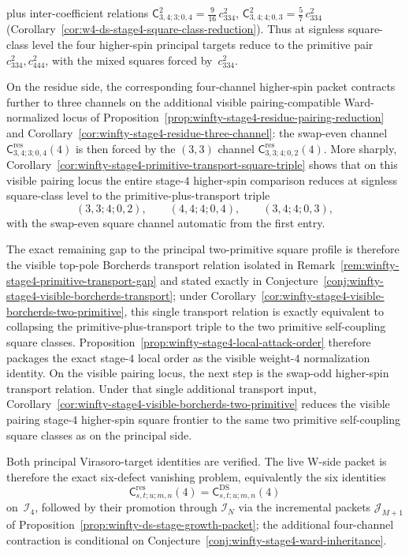 \begin{remark}
plus inter-coefficient relations
$\mathsf{C}_{3,4;3;0,4}^2 = \tfrac{9}{16}\,c_{334}^2$,
$\mathsf{C}_{3,4;4;0,3}^2 = \tfrac{5}{7}\,c_{334}^2$
\textup{(}Corollary~\ref{cor:w4-ds-stage4-square-class-reduction}\textup{)}.
Thus at signless square-class level the four higher-spin principal
targets reduce to the primitive pair
$c_{334}^2,c_{444}^2$, with the mixed squares forced by~$c_{334}^2$.

On the residue side, the corresponding four-channel higher-spin packet
contracts further to three channels on the additional visible
pairing-compatible Ward-normalized locus of
Proposition~\ref{prop:winfty-stage4-residue-pairing-reduction} and
Corollary~\ref{cor:winfty-stage4-residue-three-channel}: the swap-even
channel $\mathsf{C}^{\mathrm{res}}_{3,4;3;0,4}(4)$ is then forced by
the $(3,3)$ channel
$\mathsf{C}^{\mathrm{res}}_{3,3;4;0,2}(4)$.  More sharply,
Corollary~\ref{cor:winfty-stage4-primitive-transport-square-triple}
shows that on this visible pairing locus the entire stage-$4$
higher-spin comparison reduces at signless square-class level to the
primitive-plus-transport triple
\[
(3,3;4;0,2),\qquad (4,4;4;0,4),\qquad (3,4;4;0,3),
\]
with the swap-even square channel automatic from the first entry.

The
exact remaining gap to the principal two-primitive square profile is
therefore the visible top-pole Borcherds transport relation isolated
in Remark~\ref{rem:winfty-stage4-primitive-transport-gap} and stated
exactly in
Conjecture~\ref{conj:winfty-stage4-visible-borcherds-transport}; under
Corollary~\ref{cor:winfty-stage4-visible-borcherds-two-primitive},
this single transport relation is exactly equivalent to collapsing the
primitive-plus-transport triple to the two primitive self-coupling
square classes.  Proposition~\ref{prop:winfty-stage4-local-attack-order}
therefore packages the exact stage-$4$ local order as the
visible weight-$4$ normalization identity.  On the visible pairing
locus, the next step is the swap-odd higher-spin transport relation.  Under that single additional
transport input,
Corollary~\ref{cor:winfty-stage4-visible-borcherds-two-primitive}
reduces the visible pairing stage-$4$ higher-spin square frontier to
the same two primitive self-coupling square classes as on the
principal side.

Both principal Virasoro-target identities are verified.
The live W-side packet is therefore the exact six-defect vanishing
problem, equivalently the six identities
\[
\mathsf{C}^{\mathrm{res}}_{s,t;u;m,n}(4)
=
\mathsf{C}^{\mathrm{DS}}_{s,t;u;m,n}(4)
\]
on~$\mathcal{I}_4$, followed by their promotion through
$\mathcal{I}_N$ via the incremental packets
$\mathcal{J}_{M+1}$ of
Proposition~\ref{prop:winfty-ds-stage-growth-packet}; the additional
four-channel contraction is conditional on
Conjecture~\ref{conj:winfty-stage4-ward-inheritance}.


\end{remark}
